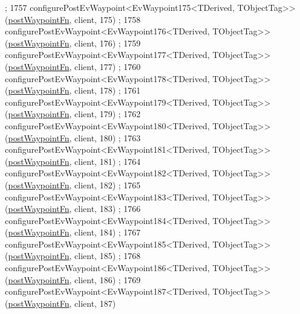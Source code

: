 \begin{DoxyCode}
      ;
1757     configurePostEvWaypoint<EvWaypoint175<TDerived, TObjectTag>>(\hyperlink{classcl__move__base__z_1_1WaypointEventDispatcher_a964a57fcce5d48ec60243230722d8dd7}{postWaypointFn}, client, 175)
      ;
1758     configurePostEvWaypoint<EvWaypoint176<TDerived, TObjectTag>>(\hyperlink{classcl__move__base__z_1_1WaypointEventDispatcher_a964a57fcce5d48ec60243230722d8dd7}{postWaypointFn}, client, 176)
      ;
1759     configurePostEvWaypoint<EvWaypoint177<TDerived, TObjectTag>>(\hyperlink{classcl__move__base__z_1_1WaypointEventDispatcher_a964a57fcce5d48ec60243230722d8dd7}{postWaypointFn}, client, 177)
      ;
1760     configurePostEvWaypoint<EvWaypoint178<TDerived, TObjectTag>>(\hyperlink{classcl__move__base__z_1_1WaypointEventDispatcher_a964a57fcce5d48ec60243230722d8dd7}{postWaypointFn}, client, 178)
      ;
1761     configurePostEvWaypoint<EvWaypoint179<TDerived, TObjectTag>>(\hyperlink{classcl__move__base__z_1_1WaypointEventDispatcher_a964a57fcce5d48ec60243230722d8dd7}{postWaypointFn}, client, 179)
      ;
1762     configurePostEvWaypoint<EvWaypoint180<TDerived, TObjectTag>>(\hyperlink{classcl__move__base__z_1_1WaypointEventDispatcher_a964a57fcce5d48ec60243230722d8dd7}{postWaypointFn}, client, 180)
      ;
1763     configurePostEvWaypoint<EvWaypoint181<TDerived, TObjectTag>>(\hyperlink{classcl__move__base__z_1_1WaypointEventDispatcher_a964a57fcce5d48ec60243230722d8dd7}{postWaypointFn}, client, 181)
      ;
1764     configurePostEvWaypoint<EvWaypoint182<TDerived, TObjectTag>>(\hyperlink{classcl__move__base__z_1_1WaypointEventDispatcher_a964a57fcce5d48ec60243230722d8dd7}{postWaypointFn}, client, 182)
      ;
1765     configurePostEvWaypoint<EvWaypoint183<TDerived, TObjectTag>>(\hyperlink{classcl__move__base__z_1_1WaypointEventDispatcher_a964a57fcce5d48ec60243230722d8dd7}{postWaypointFn}, client, 183)
      ;
1766     configurePostEvWaypoint<EvWaypoint184<TDerived, TObjectTag>>(\hyperlink{classcl__move__base__z_1_1WaypointEventDispatcher_a964a57fcce5d48ec60243230722d8dd7}{postWaypointFn}, client, 184)
      ;
1767     configurePostEvWaypoint<EvWaypoint185<TDerived, TObjectTag>>(\hyperlink{classcl__move__base__z_1_1WaypointEventDispatcher_a964a57fcce5d48ec60243230722d8dd7}{postWaypointFn}, client, 185)
      ;
1768     configurePostEvWaypoint<EvWaypoint186<TDerived, TObjectTag>>(\hyperlink{classcl__move__base__z_1_1WaypointEventDispatcher_a964a57fcce5d48ec60243230722d8dd7}{postWaypointFn}, client, 186)
      ;
1769     configurePostEvWaypoint<EvWaypoint187<TDerived, TObjectTag>>(\hyperlink{classcl__move__base__z_1_1WaypointEventDispatcher_a964a57fcce5d48ec60243230722d8dd7}{postWaypointFn}, client, 187)

\end{DoxyCode}
